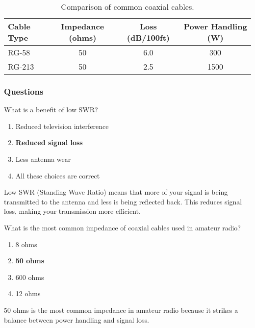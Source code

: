 \begin{table}[h!]
    \centering
    \begin{tabular}{|l|c|c|c|}
        \hline
        \textbf{Cable Type} & \textbf{Impedance (ohms)} & \textbf{Loss (dB/100ft)} & \textbf{Power Handling (W)} \\
        \hline
        RG-58 & 50 & 6.0 & 300 \\
        RG-213 & 50 & 2.5 & 1500 \\
        \hline
    \end{tabular}
    \caption{Comparison of common coaxial cables.}
    \label{tab:coax-comparison}
\end{table}

\subsubsection*{Questions}

\begin{tcolorbox}[colback=gray!10!white,colframe=black!75!black,title={T9B01}]
What is a benefit of low SWR?
\begin{enumerate}[label=\Alph*),noitemsep]
    \item Reduced television interference
    \item \textbf{Reduced signal loss}
    \item Less antenna wear
    \item All these choices are correct
\end{enumerate}
\end{tcolorbox}
Low SWR (Standing Wave Ratio) means that more of your signal is being transmitted to the antenna and less is being reflected back. This reduces signal loss, making your transmission more efficient.

\begin{tcolorbox}[colback=gray!10!white,colframe=black!75!black,title={T9B02}]
What is the most common impedance of coaxial cables used in amateur radio?
\begin{enumerate}[label=\Alph*),noitemsep]
    \item 8 ohms
    \item \textbf{50 ohms}
    \item 600 ohms
    \item 12 ohms
\end{enumerate}
\end{tcolorbox}
50 ohms is the most common impedance in amateur radio because it strikes a balance between power handling and signal loss.

